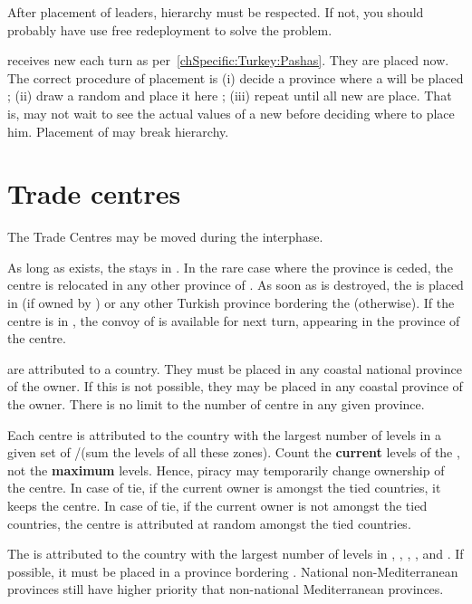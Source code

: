 \aparag[Hierarchy]
After placement of leaders, hierarchy must be respected.
\bparag If not, you should probably have use free redeployment to solve the
problem.

\aparag[\Pashas]
\TUR receives new \Pashas each turn as
per~\ref{chSpecific:Turkey:Pashas}. They are placed now.
\bparag The correct procedure of placement is (i) decide a province where a
\Pasha will be placed ; (ii) draw a random \Pasha and place it here ; (iii)
repeat until all new \Pashas are place.
\bparag That is, \TUR may not wait to see the actual values of a new \Pasha
before deciding where to place him.
\bparag Placement of \Pashas may break hierarchy.

\section{Trade centres}\label{chInter:Trade Centres}

\aparag The Trade Centres may be moved during the interphase.

 As long as \paysEgypte exists, the 
stays in \provinceNil. In the rare case where the province is ceded, the
centre is relocated in any other province of \paysEgypte.
\bparag As soon as \paysEgypte is destroyed, the  is placed
in \provinceIzmir (if owned by \TUR) or any other Turkish province bordering
the \regionMediterrannee (otherwise).
\bparag If the centre is in \TUR, the convoy of  is available for
next turn, appearing in the province of the centre.

 are attributed to a country.
\bparag They must be placed in any coastal national province of the owner.
\bparag If this is not possible, they may be placed in any coastal province of
the owner.
\bparag There is no limit to the number of centre in any given province.

\aparag[Attribution] Each centre is attributed to the country with the largest
number of \TradeFLEET levels in a given set of \STZ/\CTZ (sum the levels of
all these zones).
\bparag Count the \textbf{current} levels of the \TradeFLEET, not the
\textbf{maximum} levels. Hence, piracy may temporarily change ownership of the
centre.
\bparag In case of tie, if the current owner is amongst the tied countries, it
keeps the centre.
\bparag In case of tie, if the current owner is not amongst the tied
countries, the centre is attributed at random amongst the tied countries.

\aparag[Mediterranean]
\bparag The  is attributed to the country with the largest
number of \TradeFLEET levels in , , ,
,  and .
\bparag If possible, it must be placed in a province bordering
\regionMediterrannee. National non-Mediterranean provinces still have higher
priority that non-national Mediterranean provinces.


